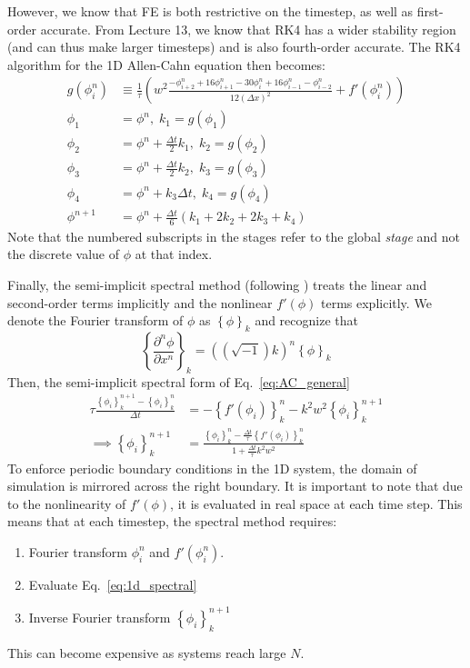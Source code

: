 \documentclass[12pt]{article}
\newcommand{\refeq}[1]{Eq.~\eqref{#1}}
\providecommand*{\pderiv}[3][]{\frac{\partial^{#1}#2}{\partial #3^{#1}}}
\newcommand{\dx}{\Delta x}
\newcommand{\dt}{\Delta t}
\begin{document}
However, we know that FE is both restrictive on the timestep, as well as first-order accurate.
From Lecture 13, we know that RK4 has a wider stability region (and can thus make larger timesteps) and is also fourth-order accurate.
The RK4 algorithm for the 1D Allen-Cahn equation then becomes:
\begin{align}
    g(\phi_i^n) &\equiv \frac{1}{\tau}\left(w^2 \frac{-\phi_{i+2}^n+16\phi_{i+1}^n-30\phi_{i}^n+16\phi_{i-1}^n - \phi_{i-2}^n}{12(\dx)^2} + f'(\phi_i^n)\right) \nonumber \\
    \phi_1 &= \phi^n, \; k_1 = g(\phi_1) \nonumber \\
    \phi_2 &= \phi^n + \frac{\dt}{2}k_1, \; k_2 = g(\phi_2) \nonumber \\
    \phi_3 &= \phi^n + \frac{\dt}{2}k_2, \; k_3 = g(\phi_3) \nonumber \\
    \phi_4 &= \phi^n + k_3 \dt, \; k_4 = g(\phi_4) \nonumber \\
    \phi^{n+1} &= \phi^n + \frac{\dt}{6}\left(k_1 + 2k_2 + 2k_3 + k_4\right) \label{eq:1d_rk4}
\end{align}
Note that the numbered subscripts in the stages refer to the global \textit{stage} and not the discrete value of $\phi$ at that index.

Finally, the semi-implicit spectral method (following \cite{biner2017programming}) treats the linear and second-order terms implicitly and the nonlinear $f'(\phi)$ terms explicitly.
We denote the Fourier transform of $\phi$ as $\left\{\phi\right\}_k$ and recognize that 
\begin{equation*}
    \left\{\pderiv[n]{\phi}{x}\right\}_k = \left(\left(\sqrt{-1}\right)k\right)^n \left\{\phi\right\}_k
\end{equation*}
Then, the semi-implicit spectral form of \refeq{eq:AC_general}
\begin{align}
    \tau \frac{\left\{\phi_i\right\}_k^{n+1} - \left\{\phi_i\right\}_k^{n}}{\dt} & = -\left\{f'(\phi_i)\right\}_k^n - k^2 w^2 \left\{\phi_i\right\}_k^{n+1} \nonumber \\
    \implies \left\{\phi_i\right\}_k^{n+1} & = \frac{\left\{\phi_i\right\}_k^n - \frac{\dt}{\tau}\left\{f'(\phi_i)\right\}_k^n}{1 + \frac{\dt}{\tau} k^2 w^2 } \label{eq:1d_spectral}
\end{align}
To enforce periodic boundary conditions in the 1D system, the domain of simulation is mirrored across the right boundary.
It is important to note that due to the nonlinearity of $f'(\phi)$, it is evaluated in real space at each time step.
This means that at each timestep, the spectral method requires:
\begin{enumerate}
    \item Fourier transform $\phi_i^n$ and $f'(\phi_i^n)$. 
    \item Evaluate \refeq{eq:1d_spectral}
    \item Inverse Fourier transform $\left\{\phi_i\right\}_k^{n+1}$
\end{enumerate}
This can become expensive as systems reach large $N$.
\end{document}
